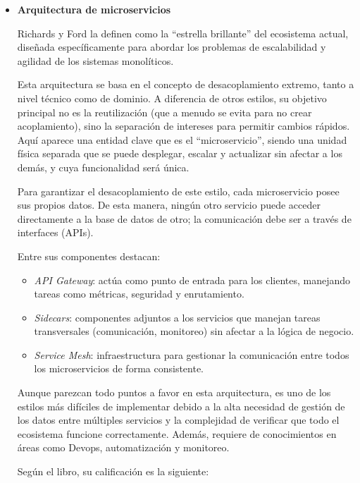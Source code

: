 \begin{itemize}
    \item \textbf{Arquitectura de microservicios}

    Richards y Ford la definen como la ``estrella brillante'' del ecosistema actual, diseñada específicamente para abordar los problemas 
    de escalabilidad y agilidad de los sistemas monolíticos.

    Esta arquitectura se basa en el concepto de desacoplamiento extremo, tanto a nivel técnico como de dominio. A diferencia de otros 
    estilos, su objetivo principal no es la reutilización (que a menudo se evita para no crear acoplamiento), sino la separación de 
    intereses para permitir cambios rápidos. Aquí aparece una entidad clave que es el ``microservicio'', siendo una unidad física 
    separada que se puede desplegar, escalar y actualizar sin afectar a los demás, y cuya funcionalidad será única.

    Para garantizar el desacoplamiento de este estilo, cada microservicio posee sus propios datos. De esta manera, ningún otro servicio 
    puede acceder directamente a la base de datos de otro; la comunicación debe ser a través de interfaces (APIs).

    Entre sus componentes destacan:

    \begin{itemize}
        \item \textit{API Gateway}: actúa como punto de entrada para los clientes, manejando tareas como métricas, seguridad y enrutamiento.
        \item \textit{Sidecars}: componentes adjuntos a los servicios que manejan tareas transversales (comunicación, monitoreo) sin 
        afectar a la lógica de negocio.
        \item \textit{Service Mesh}: infraestructura para gestionar la comunicación entre todos los microservicios de forma consistente.
    \end{itemize}

    Aunque parezcan todo puntos a favor en esta arquitectura, es uno de los estilos más difíciles de implementar debido a la alta necesidad
    de gestión de los datos entre múltiples servicios y la complejidad de verificar que todo el ecosistema funcione correctamente. Además,
    requiere de conocimientos en áreas como Devops, automatización y monitoreo.

    Según el libro, su calificación es la siguiente:


\end{itemize}

